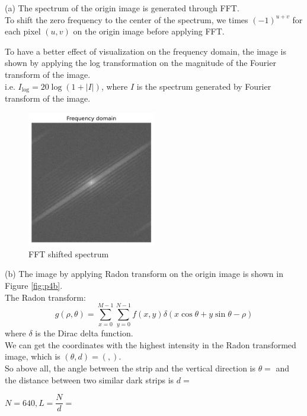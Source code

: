 (a) The spectrum of the origin image is generated through FFT.\\
To shift the zero frequency to the center of the spectrum, we times $(-1)^{u+v}$ for each pixel $(u,v)$ on the origin image before applying FFT.

To have a better effect of visualization on the frequency domain, the image is shown by applying the log transformation on the magnitude of the Fourier transform of the image.\\
i.e. $I_{\text{log}}=20\log(1+|I|)$, where $I$ is the spectrum generated by Fourier transform of the image.

\begin{figure}[htbp]
    \centering
	\includegraphics[width=0.5\textwidth]{../images/p4/p4a.png}
    \caption{FFT shifted spectrum}
    \label{fig:p4a}
\end{figure}

(b) The image by applying Radon transform on the origin image is shown in Figure \ref{fig:p4b}.\\
The Radon transform:
$$g(\rho, \theta)=\sum_{x=0}^{M-1}\sum_{y=0}^{N-1}f(x,y)\delta(x\cos\theta+y\sin\theta-\rho)$$
where $\delta$ is the Dirac delta function.\\

We can get the coordinates with the highest intensity in the Radon transformed image, which is $(\theta,d)=(,)$.\\

So above all, the angle between the strip and the vertical direction is $\theta=$
and the distance between two similar dark strips is $d=$

$N=640,L=\dfrac{N}{d}=$

